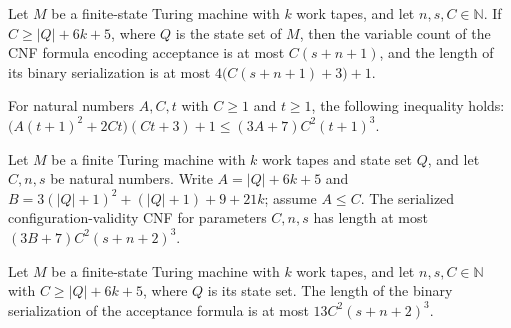 \begin{theorem}
\label{Complexity.configurationAcceptance_bounds}
\leanok
{}
Let $M$ be a finite-state Turing machine with $k$ work tapes, and let $n,s,C\in\mathbb
N$. If $C\ge |Q|+6k+5$, where $Q$ is the state set of $M$, then the variable count of
the CNF formula encoding acceptance is at most $C(s+n+1)$, and the length of its binary
serialization is at most $4\bigl(C(s+n+1)+3\bigr)+1$.
\end{theorem}

\begin{theorem}
\label{Complexity.codec_size_normalize}
\leanok
{}
For natural numbers $A,C,t$ with $C\ge1$ and $t\ge1$, the following inequality holds:
$\bigl(A(t+1)^2+2Ct\bigr)(Ct+3)+1\le(3A+7)C^2(t+1)^3$.
\end{theorem}

\begin{theorem}
\label{Complexity.configurationValidity_size}
\leanok
{}
Let $M$ be a finite Turing machine with $k$ work tapes and state set $Q$, and let
$C,n,s$ be natural numbers. Write $A=|Q|+6k+5$ and $B=3(|Q|+1)^2+(|Q|+1)+9+21k$; assume
$A\le C$. The serialized configuration-validity CNF for parameters $C,n,s$ has length at
most $(3B+7)C^2(s+n+2)^3$.
\end{theorem}

\begin{theorem}
\label{Complexity.configurationAcceptance_size}
\leanok
{}
Let $M$ be a finite-state Turing machine with $k$ work tapes, and let $n,s,C\in\mathbb
N$ with $C\ge |Q|+6k+5$, where $Q$ is its state set. The length of the binary
serialization of the acceptance formula is at most $13C^2(s+n+2)^3$.
\end{theorem}

